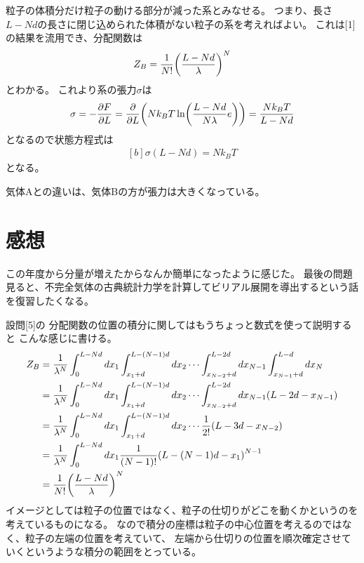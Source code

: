 \documentclass[../ap_2012.tex]{subfiles}
\begin{document}
\section{}
粒子の体積分だけ粒子の動ける部分が減った系とみなせる。
つまり、長さ\(L-Nd\)の長さに閉じ込められた体積がない粒子の系を考えればよい。
これは[1]の結果を流用でき、分配関数は
\begin{equation}\begin{aligned}[b]
    Z_B= \frac{1}{N!}\qty(\frac{L-Nd}{\lambda})^N
\end{aligned}\end{equation}
とわかる。
これより系の張力\(\sigma\)は
\begin{equation}\begin{aligned}[b]
    \sigma = -\pdv{F}{L}
    = \pdv{L}\qty(Nk_BT\ln(\frac{L-Nd}{N\lambda}e))
    =\frac{Nk_BT}{L-Nd}
\end{aligned}\end{equation}
となるので状態方程式は
\begin{equation}\begin{aligned}[b]
    \sigma(L-Nd)=Nk_BT
\end{aligned}\end{equation}
となる。

気体Aとの違いは、気体Bの方が張力は大きくなっている。


\section*{感想}
この年度から分量が増えたからなんか簡単になったように感じた。
最後の問題見ると、不完全気体の古典統計力学を計算してビリアル展開を導出するという話を復習したくなる。

設問[5]の
分配関数の位置の積分に関してはもうちょっと数式を使って説明すると
こんな感じに書ける。
\begin{equation*}\begin{aligned}[b]
    Z_B
    &=\frac{1}{\lambda^N}\int_0^{L-Nd}dx_1\int_{x_1+d}^{L-(N-1)d}dx_2\cdots\int_{x_{N-2}+d}^{L-2d}dx_{N-1}\int_{x_{N-1}+d}^{L-d}dx_N\\
    &=\frac{1}{\lambda^N}\int_0^{L-Nd}dx_1\int_{x_1+d}^{L-(N-1)d}dx_2\cdots\int_{x_{N-2}+d}^{L-2d}dx_{N-1}\qty(L-2d-x_{N-1})\\
    &=\frac{1}{\lambda^N}\int_0^{L-Nd}dx_1\int_{x_1+d}^{L-(N-1)d}dx_2\cdots \frac{1}{2!}\qty(L-3d-x_{N-2})\\
    &=\frac{1}{\lambda^N}\int_0^{L-Nd}dx_1 \frac{1}{(N-1)!}\qty(L-(N-1)d-x_1)^{N-1}\\
    &= \frac{1}{N!}\qty(\frac{L-Nd}{\lambda})^N
\end{aligned}\end{equation*}
イメージとしては粒子の位置ではなく、粒子の仕切りがどこを動くかというのを考えているものになる。
なので積分の座標は粒子の中心位置を考えるのではなく、粒子の左端の位置を考えていて、
左端から仕切りの位置を順次確定させていくというような積分の範囲をとっている。
\end{document}
